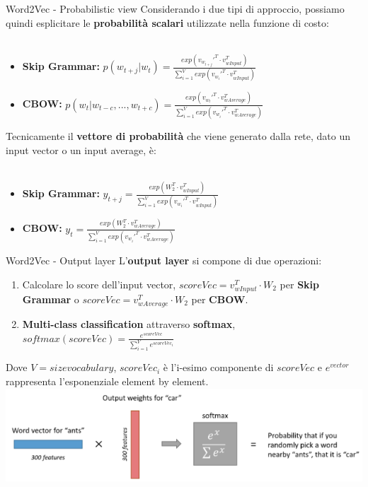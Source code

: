 \documentclass[british]{beamer}
\begin{document}
\begin{frame}{Word2Vec - Probabilistic view}
	Considerando i due tipi di approccio, possiamo quindi esplicitare le \textbf{probabilit\`{a} scalari} utilizzate nella funzione di costo:
	\\~\\
	\begin{itemize}
		\item \textbf{Skip Grammar: }
		\(p(w_{t+j}|w_{t}) = \frac{exp(v_{w_{t+j}}'^T \cdot v_{wInput}^T)}{\sum_{i=1}^{V}exp(v_{w_i}'^T \cdot v_{wInput}^T)}\)
		\item \textbf{CBOW: }
		\(p(w_{t}|w_{t-c}, ... , w_{t+c}) = \frac{exp(v_{w_{t}}'^T \cdot v_{wAverage}^T)}{\sum_{i=1}^{V}exp(v_{w_i}'^T \cdot v_{wAverage}^T)}\)
	\end{itemize}
	Tecnicamente il \textbf{vettore di probabilit\`{a}} che viene generato dalla rete, dato un input vector o un input average, \`{e}:
	\\~\\
	\begin{itemize}
		\item \textbf{Skip Grammar: }
		\(y_{t+j} = \frac{exp(W_2^T \cdot v_{wInput}^T)}{\sum_{i=1}^{V}exp(v_{w_i}'^T \cdot v_{wInput}^T)}\)
		\item \textbf{CBOW: }
		\(y_t = \frac{exp(W_2^T \cdot v_{wAverage}^T)}{\sum_{i=1}^{V}exp(v_{w_i}'^T \cdot v_{wAverage}^T)}\)
	\end{itemize}
\end{frame}

\begin{frame}{Word2Vec - Output layer}
	L'\textbf{output layer} si compone di due operazioni:
	\begin{enumerate}
		\item Calcolare lo score dell'input vector, \(scoreVec = v_{wInput}^T \cdot W_2\) per \textbf{Skip Grammar} o \(scoreVec = v_{wAverage}^T \cdot W_2\) per \textbf{CBOW}.
		\item \textbf{Multi-class classification} attraverso \textbf{softmax}, \(softmax(scoreVec) = \frac{e^{scoreVec}}{\sum_{i=1}^{V}e^{scoreVec_i}}\)
	\end{enumerate}
	Dove \(V = sizevocabulary\), \(scoreVec_i\) \`{e} l'i-esimo componente di \(scoreVec\) e \(e^{vector}\) rappresenta l'esponenziale element by element.
	\includegraphics[width=0.9\linewidth,height=0.25\textwidth]{./Imgs/output_layer}
\end{frame}
\end{document}
